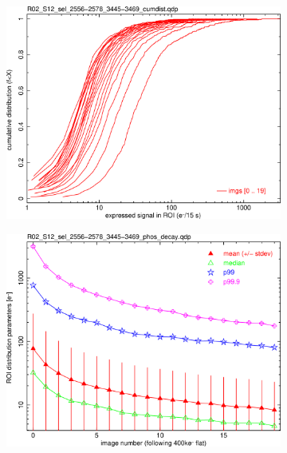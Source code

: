 \begin{figure}[!htbp]
\begin{subfigure}{0.45\textwidth}    
  \centering
  \includegraphics[width=\textwidth]{figures/phosphorescence-survey/phos_kinetics/R02_S12_sel_2556-2578_3445-3469_cumdist.png}    
\end{subfigure}
\hfil
\begin{subfigure}{0.45\textwidth}
  \centering
  \includegraphics[width=\textwidth]{figures/phosphorescence-survey/phos_kinetics/R02_S12_sel_2556-2578_3445-3469_phos_decay.png}
\end{subfigure}
\newline
\begin{subfigure}{0.45\textwidth}    

\end{subfigure}
\end{figure}
